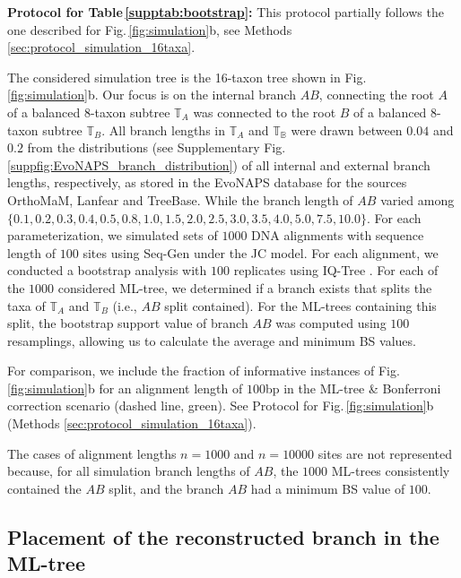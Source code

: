\begin{appendices}
\noindent\textbf{Protocol for Table\,\ref{supptab:bootstrap}:} This protocol partially follows the one described for Fig.\,\ref{fig:simulation}b, see Methods \ref{sec:protocol_simulation_16taxa}.

\medskip

The considered simulation tree is the 16-taxon tree shown in Fig.\,\ref{fig:simulation}b. Our focus is on the internal branch $AB$, connecting the root $A$ of a balanced $8$-taxon subtree $\mathbb{T}_A$ was connected to the root $B$ of a balanced $8$-taxon subtree $\mathbb{T}_B$. All branch lengths in $\mathbb{T}_A$ and $\mathbb{T_B}$ were drawn between $0.04$ and $0.2$ from the distributions (see Supplementary Fig.\,\ref{suppfig:EvoNAPS_branch_distribution}) of all internal and external branch lengths, respectively, as stored in the EvoNAPS database  for the sources OrthoMaM, Lanfear and TreeBase. While the branch length of $AB$ varied among $\{0.1, 0.2, 0.3, 0.4, 0.5, 0.8, 1.0, 1.5, 2.0, 2.5, 3.0, 3.5, 4.0, 5.0, 7.5, 10.0\}$. For each parameterization, we simulated sets of $1000$ DNA alignments with sequence length of $100$ sites using Seq-Gen  under the JC model. For each alignment, we conducted a bootstrap analysis with $100$ replicates using IQ-Tree . For each of the $1000$ considered ML-tree, we determined if a branch exists that splits the taxa of $\mathbb{T}_A$ and $\mathbb{T}_B$ (i.e., $AB$ split contained). For the ML-trees containing this split, the bootstrap support value of branch $AB$ was computed using $100$ resamplings, allowing us to calculate the average and minimum BS values.

\medskip


For comparison, we include the fraction of informative instances of Fig.\,\ref{fig:simulation}b for an alignment length of $100$bp in the ML-tree \& Bonferroni correction scenario (dashed line, {\color{MLtreeBonferroni} green}). See  Protocol for Fig.\,\ref{fig:simulation}b (Methods \ref{sec:protocol_simulation_16taxa}).

\medskip

The cases of alignment lengths $n=1000$ and $n=10000$ sites are not represented because, for all simulation branch lengths of $AB$, the $1000$ ML-trees consistently contained the $AB$ split, and the branch $AB$ had a minimum BS value of $100$.

\medskip


\subsection{Placement of the reconstructed branch in the ML-tree}



\end{appendices}
